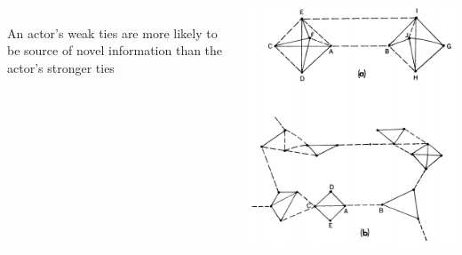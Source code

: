 \documentclass[8pt]{beamer}
\begin{document}
\begin{frame}
\frametitle{\insertsection}

\begin{columns}[c]
{\color{blue}{Strength of weak ties}}\\
An actor's weak ties are more likely to be source of novel information than the actor's stronger ties

\centering
\includegraphics[width=\textwidth]{swt}\\
{\tiny \cite{Granovetter1973}}

\end{columns}

\end{frame}

\end{document}
